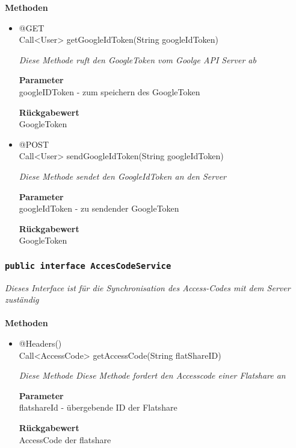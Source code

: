 		\textbf{Methoden} \\
 			\begin{itemize}
        		\item{@GET\\ Call<User> getGoogleIdToken(String googleIdToken)}
        	
        		\textit{Diese Methode ruft den GoogleToken vom Goolge API Server ab}
        	
        		\textbf{Parameter} \\
                googleIDToken - zum speichern des GoogleToken
        		        	
       		 	\textbf{Rückgabewert} \\
                GoogleToken
      		  	 
      	      \item{@POST\\ Call<User> sendGoogleIdToken(String googleIdToken)}
        	
      	 	 	\textit{Diese Methode sendet den GoogleIdToken an den Server}
        	
        		\textbf{Parameter} \\
        		googleIdToken - zu sendender GoogleToken
        	
        		\textbf{Rückgabewert} \\
                GoogleToken
        	
       		 \end{itemize}
             
             	\subsubsection{\texttt{public interface AccesCodeService}}
        \textit{Dieses Interface ist für die Synchronisation des Access-Codes mit dem Server zuständig }\\
        \\
		\textbf{Methoden} \\
 			\begin{itemize}
        		\item{@Headers()\\ Call<AccessCode> getAccessCode(String flatShareID)}
        	
        		\textit{Diese Methode Diese Methode fordert den Accesscode einer Flatshare an}
        	
        		\textbf{Parameter} \\
                flatshareId - übergebende ID der Flatshare
        		        	
       		 	\textbf{Rückgabewert} \\
                AccessCode der flatshare
      		  	 
      	        	
       		 \end{itemize}
             
